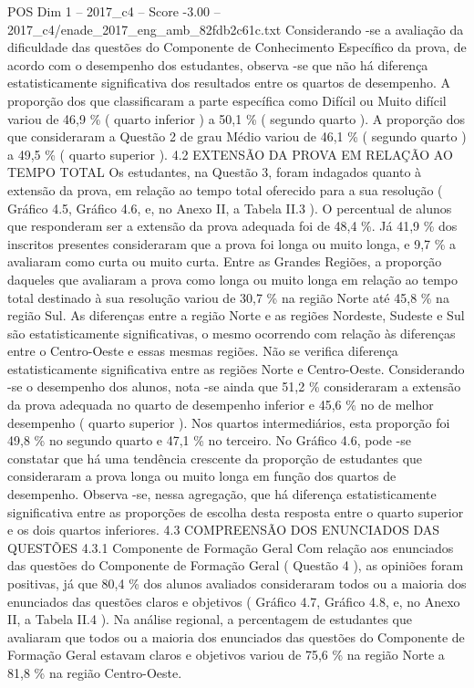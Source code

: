 \begin{textsample}{POS Dim 1 – 2017\_c4 – Score -3.00 – 2017\_c4/enade\_2017\_eng\_amb\_82fdb2c61c.txt}
Considerando -se a avaliação da dificuldade das questões do Componente de Conhecimento Específico da prova, de acordo com o desempenho dos estudantes, observa -se que não há diferença estatisticamente significativa dos resultados entre os quartos de desempenho.
A proporção dos que classificaram a parte específica como Difícil ou Muito difícil variou de 46,9 \% ( quarto inferior ) a 50,1 \% ( segundo quarto ).
A proporção dos que consideraram a Questão 2 de grau Médio variou de 46,1 \% ( segundo quarto ) a 49,5 \% ( quarto superior ). 4.2 EXTENSÃO DA PROVA EM RELAÇÃO AO TEMPO TOTAL Os estudantes, na Questão 3, foram indagados quanto à extensão da prova, em relação ao tempo total oferecido para a sua resolução ( Gráfico 4.5, Gráfico 4.6, e, no Anexo II, a Tabela II.3 ).
O percentual de alunos que responderam ser a extensão da prova adequada foi de 48,4 \%.
Já 41,9 \% dos inscritos presentes consideraram que a prova foi longa ou muito longa, e 9,7 \% a avaliaram como curta ou muito curta.
Entre as Grandes Regiões, a proporção daqueles que avaliaram a prova como longa ou muito longa em relação ao tempo total destinado à sua resolução variou de 30,7 \% na região Norte até 45,8 \% na região Sul.
As diferenças entre a região Norte e as regiões Nordeste, Sudeste e Sul são estatisticamente significativas, o mesmo ocorrendo com relação às diferenças entre o Centro-Oeste e essas mesmas regiões.
Não se verifica diferença estatisticamente significativa entre as regiões Norte e Centro-Oeste.
Considerando -se o desempenho dos alunos, nota -se ainda que 51,2 \% consideraram a extensão da prova adequada no quarto de desempenho inferior e 45,6 \% no de melhor desempenho ( quarto superior ).
Nos quartos intermediários, esta proporção foi 49,8 \% no segundo quarto e 47,1 \% no terceiro.
No Gráfico 4.6, pode -se constatar que há uma tendência crescente da proporção de estudantes que consideraram a prova longa ou muito longa em função dos quartos de desempenho.
Observa -se, nessa agregação, que há diferença estatisticamente significativa entre as proporções de escolha desta resposta entre o quarto superior e os dois quartos inferiores. 4.3 COMPREENSÃO DOS ENUNCIADOS DAS QUESTÕES 4.3.1 Componente de Formação Geral Com relação aos enunciados das questões do Componente de Formação Geral ( Questão 4 ), as opiniões foram positivas, já que 80,4 \% dos alunos avaliados consideraram todos ou a maioria dos enunciados das questões claros e objetivos ( Gráfico 4.7, Gráfico 4.8, e, no Anexo II, a Tabela II.4 ).
Na análise regional, a percentagem de estudantes que avaliaram que todos ou a maioria dos enunciados das questões do Componente de Formação Geral estavam claros e objetivos variou de 75,6 \% na região Norte a 81,8 \% na região Centro-Oeste.

\end{textsample}
